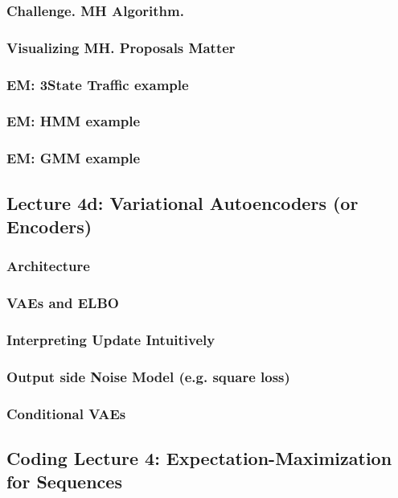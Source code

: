 \documentclass[12pt]{article}
\begin{document}
      \subsubsection*{Challenge.  MH Algorithm.}
      \subsubsection*{Visualizing MH.  Proposals Matter}
      \subsubsection*{EM: 3State Traffic example}
      \subsubsection*{EM: HMM example}
      \subsubsection*{EM: GMM example}
    \newpage

    \subsection*{Lecture 4d: Variational Autoencoders (or Encoders)} %
      \subsubsection*{Architecture} %
      \subsubsection*{VAEs and ELBO}
      \subsubsection*{Interpreting Update Intuitively}
      \subsubsection*{Output side Noise Model (e.g. square loss)}
      \subsubsection*{Conditional VAEs}
    \newpage

    \subsection*{Coding Lecture 4: Expectation-Maximization for Sequences}
\end{document}
